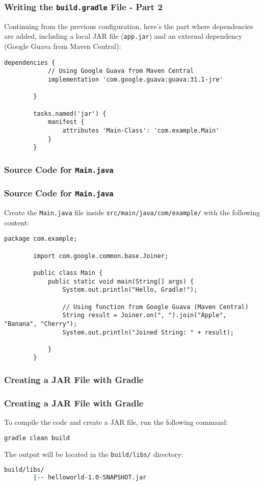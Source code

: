 \documentclass[aspectratio=169, table]{beamer}
\begin{document}
\begin{frame}[fragile]
	\vspace{20pt}
	\frametitle{Writing the \texttt{build.gradle} File - Part 2}
	Continuing from the previous configuration, here’s the part where dependencies are added, including a local JAR file (\texttt{app.jar}) and an external dependency (Google Guava from Maven Central):
	\begin{lstlisting}[style=XmlStyle]
		dependencies {
			// Using Google Guava from Maven Central
			implementation 'com.google.guava:guava:31.1-jre'

		}
		
		tasks.named('jar') {
			manifest {
				attributes 'Main-Class': 'com.example.Main'
			}
		}
	\end{lstlisting}
\end{frame}

\subsubsection{Source Code for \texttt{Main.java}}
\begin{frame}[fragile]
	\frametitle{Source Code for \texttt{Main.java}}
	Create the \texttt{Main.java} file inside \texttt{src/main/java/com/example/} with the following content:
	\begin{lstlisting}[style=JavaStyle]
		package com.example;
		
		import com.google.common.base.Joiner;
		
		public class Main {
			public static void main(String[] args) {
				System.out.println("Hello, Gradle!");
				
				// Using function from Google Guava (Maven Central)
				String result = Joiner.on(", ").join("Apple", "Banana", "Cherry");
				System.out.println("Joined String: " + result);
				
			}
		}
	\end{lstlisting}
\end{frame}

\subsubsection{Creating a JAR File with Gradle}
\begin{frame}[fragile]
	\frametitle{Creating a JAR File with Gradle}
	To compile the code and create a JAR file, run the following command:
	\begin{lstlisting}[language=bash]
		gradle clean build
	\end{lstlisting}
	The output will be located in the \texttt{build/libs/} directory:
	\begin{lstlisting}[language=bash]
		build/libs/
		|-- helloworld-1.0-SNAPSHOT.jar
	\end{lstlisting}
\end{frame}
\end{document}

